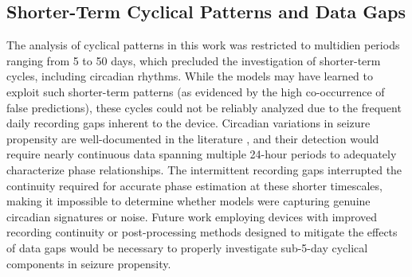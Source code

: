 \subsection{Shorter-Term Cyclical Patterns and Data Gaps}\label{subsec:shorter-term-cyclical-patterns-and-data-gaps}
The analysis of cyclical patterns in this work was restricted to multidien periods ranging from 5 to 50 days, which precluded the investigation of shorter-term cycles, including circadian rhythms.
While the models may have learned to exploit such shorter-term patterns (as evidenced by the high co-occurrence of false predictions), these cycles could not be reliably analyzed due to the frequent daily recording gaps inherent to the device.
Circadian variations in seizure propensity are well-documented in the literature \parencite{karoly_cycles_2021}, and their detection would require nearly continuous data spanning multiple 24-hour periods to adequately characterize phase relationships.
The intermittent recording gaps interrupted the continuity required for accurate phase estimation at these shorter timescales, making it impossible to determine whether models were capturing genuine circadian signatures or noise.
Future work employing devices with improved recording continuity or post-processing methods designed to mitigate the effects of data gaps would be necessary to properly investigate sub-5-day cyclical components in seizure propensity.